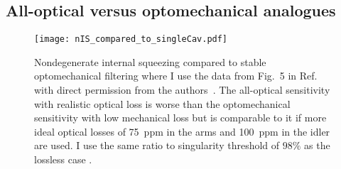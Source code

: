 \subsection{All-optical versus optomechanical analogues}
\label{sec:nIS_vs_sWLC}

\begin{figure}
	\centering
	\texttt{[image: nIS\_compared\_to\_singleCav.pdf]}
	\caption{  Nondegenerate internal squeezing compared to stable optomechanical filtering where I use the data from Fig.~5 in Ref.~\cite{} with direct permission from the authors~\cite{personalCorrespondence}. The all-optical sensitivity with realistic optical loss is worse than the optomechanical sensitivity with low mechanical loss but is comparable to it if more ideal optical losses of 75~ppm in the arms and 100~ppm in the idler are used. I use the same ratio to singularity threshold of $98\%$ as the lossless case . }
	\label{fig:nIS_vs_sWLC}
\end{figure}


